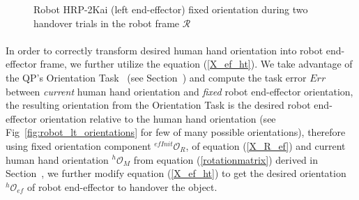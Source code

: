 \documentclass[a4paper, 12pt, oneside]{Thesis}  %
\begin{document}
\begin{figure}[ht]
	\caption{Robot HRP-2Kai (left end-effector) fixed orientation during two handover trials in the robot frame $\mathcal{R}$}
	\label{fig:robot_lt_hand_2layers}
\end{figure} 

\paragraph*{}
In order to correctly transform desired human hand orientation into robot end-effector frame, we further utilize the equation (\ref{X_ef_ht}). We take advantage of the QP's Orientation Task~\cite{murray2017mathematical, ladder-HRP-2Kai} (see Section~) and compute the task error $Err$ between \textit{current} human hand orientation and \textit{fixed} robot end-effector orientation, the resulting orientation from the Orientation Task is the desired robot end-effector orientation relative to the human hand orientation (see Fig~\ref{fig:robot_lt_orientations} for few of many possible orientations), therefore using fixed orientation component  ${{}^{efInit}\mathcal{O}_R}$, of equation (\ref{X_R_ef}) and current human hand orientation ${}^{h}\mathcal{O}_M$ from equation (\ref{rotationmatrix}) derived in Section~, we further modify equation (\ref{X_ef_ht}) to get the desired orientation $ {}^{h}\mathcal{O}_{ef} $ of robot end-effector to handover the object.
\end{document}
